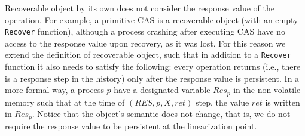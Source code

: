 {Recoverable object by its own does not consider the response value of the operation. For example, a primitive CAS is a recoverable object (with an empty \texttt{Recover} function), although a process crashing after executing CAS have no access to the response value upon recovery, as it was lost. For this reason we extend the definition of recoverable object, such that in addition to a \texttt{Recover} function it also needs to satisfy the following: every operation returns (i.e., there is a response step in the history) only after the response value is persistent. In a more formal way, a process $p$ have a designated variable $Res_p$ in the non-volatile memory such that at the time of $(RES,p,X,ret)$ step, the value $ret$ is written in $Res_p$.
Notice that the object's semantic does not change, that is, we do not require the response value to be persistent at the linearization point.
}%